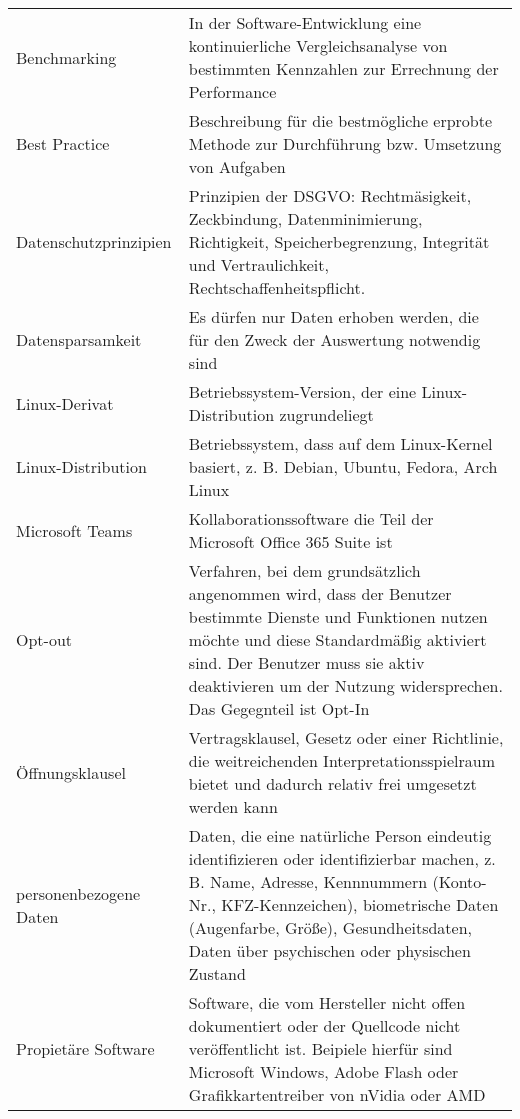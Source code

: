 \renewcommand*{\arraystretch}{1.4}
\begin{longtable}{p{}p{}}

    Benchmarking & In der Software-Entwicklung eine kontinuierliche Vergleichsanalyse von bestimmten Kennzahlen zur Errechnung der Performance\\

    Best Practice & Beschreibung für die bestmögliche erprobte Methode zur Durchführung bzw. Umsetzung von Aufgaben\\

    Datenschutzprinzipien & Prinzipien der DSGVO: Rechtmäsigkeit, Zeckbindung, Datenminimierung, Richtigkeit, Speicherbegrenzung, Integrität und Vertraulichkeit, Rechtschaffenheitspflicht.\\

    Datensparsamkeit & Es dürfen nur Daten erhoben werden, die für den Zweck der Auswertung notwendig sind\\

    Linux-Derivat & Betriebssystem-Version, der eine Linux-Distribution zugrundeliegt\\

    Linux-Distribution & Betriebssystem, dass auf dem Linux-Kernel basiert, z. B. Debian, Ubuntu, Fedora, Arch Linux\\

    Microsoft Teams & Kollaborationssoftware die Teil der Microsoft Office 365 Suite ist\\

    Opt-out & Verfahren, bei dem grundsätzlich angenommen wird, dass der Benutzer bestimmte Dienste und Funktionen nutzen möchte und diese Standardmäßig aktiviert sind. Der Benutzer muss sie aktiv deaktivieren um der Nutzung widersprechen. Das Gegegnteil ist Opt-In\\

    Öffnungsklausel & Vertragsklausel, Gesetz oder einer Richtlinie, die weitreichenden Interpretationsspielraum bietet und dadurch relativ frei umgesetzt werden kann\\

    personenbezogene Daten & Daten, die eine natürliche Person eindeutig identifizieren oder identifizierbar machen, z. B. Name, Adresse, Kennnummern (Konto-Nr., KFZ-Kennzeichen), biometrische Daten (Augenfarbe, Größe), Gesundheitsdaten, Daten über psychischen oder physischen Zustand\\

    Propietäre Software & Software, die vom Hersteller nicht offen dokumentiert oder der Quellcode nicht veröffentlicht ist. Beipiele hierfür sind Microsoft Windows, Adobe Flash oder Grafikkartentreiber von nVidia oder AMD\\


\end{longtable}
